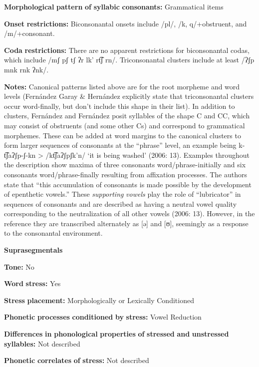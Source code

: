 \begin{styleBody}
\textbf{Morphological} \textbf{pattern} \textbf{of} \textbf{syllabic} \textbf{consonants:} Grammatical items

\textbf{Onset} \textbf{restrictions:} Biconsonantal onsets include /pl/, /k, q/+obstruent, and /m/+consonant.

\textbf{Coda} \textbf{restrictions:} There are no apparent restrictions for biconsonantal codas, which include /mʃ pʃ tʃ ʔr lk' rt͡ʃ rn/. Triconsonantal clusters include at least /ʔʃp mnk rnk ʔnk/.

\textbf{Notes:} Canonical patterns listed above are for the root morpheme and word levels (Fernández Garay \& Hernández explicitly state that triconsonantal clusters occur word-finally, but don’t include this shape in their list). In addition to clusters, Fernández \citet{Garay1998} and Fernández \citet{GarayHernández2006} posit syllables of the shape C and CC, which may consist of obstruents (and some other Cs) and correspond to grammatical morphemes. These can be added at word margins to the canonical clusters to form larger sequences of consonants at the “phrase” level, an example being k{}-t͡ʃaʔʃp{}-ʃ{}-kn > /kt͡ʃaʔʃpʃk’n/ ‘it is being washed’ (2006: 13). Examples throughout the description show maxima of three consonants word/phrase-initially and six consonants word/phrase-finally resulting from affixation processes. The authors state that “this accumulation of consonants is made possible by the development of epenthetic vowels.” These \textit{supporting} \textit{vowels} play the role of “lubricator” in sequences of consonants and are described as having a neutral vowel quality corresponding to the neutralization of all other vowels (2006: 13). However, in the  reference they are transcribed alternately as [ə] and [ʊ], seemingly as a response to the consonantal environment.

\textbf{Suprasegmentals}

\textbf{Tone:} No

\textbf{Word} \textbf{stress:} Yes

\textbf{Stress} \textbf{placement:} Morphologically or Lexically Conditioned

\textbf{Phonetic} \textbf{processes} \textbf{conditioned} \textbf{by} \textbf{stress:} Vowel Reduction

\textbf{Differences} \textbf{in} \textbf{phonological} \textbf{properties} \textbf{of} \textbf{stressed} \textbf{and} \textbf{unstressed} \textbf{syllables:} Not described

\textbf{Phonetic} \textbf{correlates} \textbf{of} \textbf{stress:} Not described


\end{styleBody}
